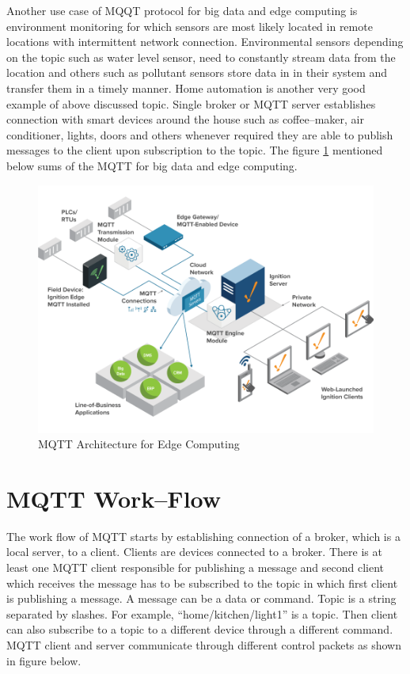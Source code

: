 \documentclass[sigconf]{acmart}
\begin{document}
Another use case of MQQT protocol for big data and edge computing is environment monitoring for which sensors are most likely located in remote locations with intermittent network  connection. Environmental sensors depending on the topic such as water level sensor, need to constantly stream data from the location and others such as pollutant sensors store data in in their system and transfer them in a timely manner. Home automation is another  very good example of above discussed topic. Single broker or MQTT server establishes connection with smart devices around the house such as coffee--maker, air conditioner, lights, doors and others whenever required they are able to publish messages to the client upon subscription to the topic. The figure \ref{p:MQTT Architecture for Edge Computing} mentioned below sums of the MQTT for big data and edge computing.
\begin{figure}
\includegraphics[width=1.0\columnwidth]{images/mqttArchitectureforEdgeComputing.png}
\caption{MQTT Architecture for Edge Computing}\label{p:MQTT Architecture for Edge Computing}


\end{figure}






\section{MQTT Work--Flow}
The work flow of MQTT starts by establishing connection of a broker, which is a local server, to a client. Clients are devices connected to a broker. There is at least one MQTT client responsible for publishing a message and second client which receives the message has to be subscribed to the topic in which first client is publishing a message. A message can be a data or command. Topic is a string separated by slashes. For example, ``home/kitchen/light1'' is a topic. Then client can also subscribe to a topic to a different device through a different command. MQTT client and server communicate through different control packets as shown in figure below.
\end{document}
